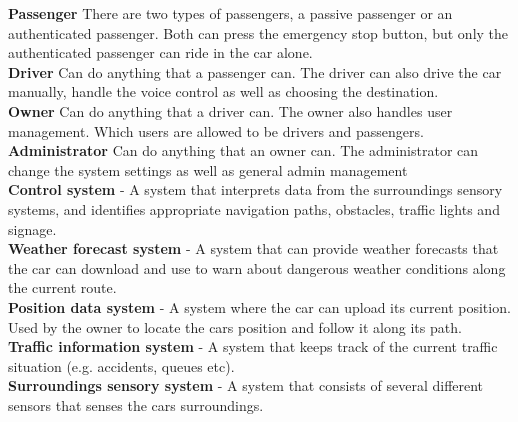 \documentclass{article}
\begin{document}
\noindent
\textbf{Passenger} There are two types of passengers, a passive passenger or an authenticated passenger. Both can press the emergency stop button, but only the authenticated passenger can ride in the car alone.\\
\textbf{Driver} Can do anything that a passenger can.
The driver can also drive the car manually, handle the voice control as well as choosing the destination. \\
\textbf{Owner} Can do anything that a driver can. The owner also handles user management. Which users are allowed to be drivers and passengers. \\
\textbf{Administrator} Can do anything that an owner can.
The administrator can change the system settings as well as general admin management \\
\textbf{Control system} - A system that interprets data from the surroundings sensory systems, and identifies appropriate navigation paths, obstacles, traffic lights and signage. \\
\textbf{Weather forecast system} - A system that can provide weather forecasts that the car can download and use to warn about dangerous weather conditions along the current route.  \\
\textbf{Position data system} - A system where the car can upload its current position. Used by the owner to locate the cars position and follow it along its path.  \\
\textbf{Traffic information system} - A system that keeps track of the current traffic situation (e.g. accidents, queues etc). \\
\textbf{Surroundings sensory system} - A system that consists of several different sensors that senses the cars surroundings.  \\
\end{document}
